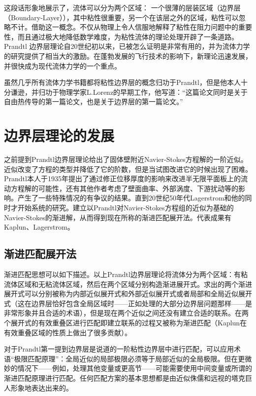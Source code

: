     这段话形象地展示了，流体可以分为两个区域： 一个很薄的层装区域（边界层（Boundary-Layer）），其中粘性很重要，另一个在该层之外的区域，粘性可以忽略不计。借助这一概念。不仅从物理上令人信服地解释了粘性在阻力问题中的重要性，而且通过极大地降低数学难度，为粘性流体的理论处理开辟了一条道路。Prandtl 边界层理论自20世纪初以来，已被怎么证明是非常有用的，并为流体力学的研究提供了相当大的激励。在蓬勃发展的飞行技术的影响下，新理论迅速发展，并很快成为现代流体力学的一个重点。

    虽然几乎所有流体力学书籍都将粘性边界层的概念归功于Prandtl，但是他本人十分谦逊，并归功于物理学家L.Lorenz的早期工作\cite{Lorenz1881}，他写道：“这篇论文同时是关于自由热传导的第一篇论文，也是关于边界层的第一篇论文\cite{Prandtl1953}。”


    \section{边界层理论的发展}\label{sec:发展}
    之前提到Prandtl边界层理论给出了固体壁附近Navier-Stokes方程解的一阶近似。近似改变了方程的类型并降低了它的阶数，但是当试图改进它的时候出现了困难。Prandtl本人于1935年提出了通过修正位移厚度的影响来改进半无限平面板上的流动方程解的可能性\cite{Prandtl1935}，还有其他作者考虑了壁面曲率、外部涡度、下游扰动等的影响。产生了一些特殊情况的有争议的结果。直到20世纪50年代Lagerstrom和他的同时才开始系统的研究。建立以Prandtl对Navier-Stokes方程组的近似为基础的Navier-Stokes的渐进解，从而得到现在所称的渐进匹配展开法。代表成果有Kaplun\cite{Lagerstrom1967}、Lagerstrom\cite{Lagerstrom1989}。

		\subsection{渐进匹配展开法}\label{sub:渐进匹配法}
 
        渐进匹配思想可以如下描述。以上Prandtl边界层理论将流体分为两个区域：有粘流体区域和无粘流体区域，然后在两个区域分别构造渐进展开式。求出的两个渐进展开式可以分别被称为内部近似展开式和外部近似展开式或者局部和全局近似展开式（这在边界层恰好包含全局区域时——正如处理的大部分边界层问题那样——是非常形象并且合适的术语），但是现在两个近似之间还没有建立合适的联系。在两个展开式的有效重叠区进行匹配即建立联系的过程又被称为渐进匹配（Kaplun在有效重叠区域的性质上做出了很多贡献）。

        对于Prandtl第一提到边界层是说道的一阶粘性边界层中进行匹配，可以应用术语“极限匹配原理”：全局近似的局部极限必须等于局部近似的全局极限。但在更微妙的情况下——例如，处理其他变量或更高节——可能需要使用中间变量或所谓的渐进匹配原理进行匹配。任何匹配方案的基本思想都是由近似侏儒和远视的塔克巨人形象地表达出来的\cite{Tuck1971}。

